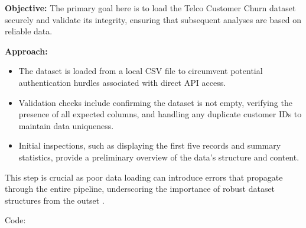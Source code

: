 \documentclass[preprint, 3p,
authoryear]{elsarticle} %
\providecommand{\tightlist}{%
  \setlength{\itemsep}{0pt}\setlength{\parskip}{0pt}}
\begin{document}
\textbf{Objective:} The primary goal here is to load the Telco Customer
Churn dataset securely and validate its integrity, ensuring that
subsequent analyses are based on reliable data.

\textbf{Approach:}

\begin{itemize}
\tightlist
\item
  The dataset is loaded from a local CSV file to circumvent potential
  authentication hurdles associated with direct API access.
\item
  Validation checks include confirming the dataset is not empty,
  verifying the presence of all expected columns, and handling any
  duplicate customer IDs to maintain data uniqueness.
\item
  Initial inspections, such as displaying the first five records and
  summary statistics, provide a preliminary overview of the data's
  structure and content.
\end{itemize}

This step is crucial as poor data loading can introduce errors that
propagate through the entire pipeline, underscoring the importance of
robust dataset structures from the outset \citep{foxwell2020creating}.

Code:
\end{document}
